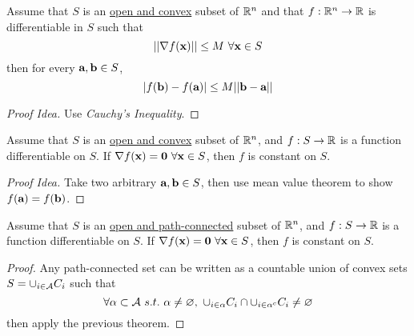 \documentclass[11pt]{article}
\newcommand{\vex}[0]{\ve{x}}
\newcommand{\vea}[0]{\ve{a}}
\newcommand{\veb}[0]{\ve{b}}
\begin{document}
			\begin{theorem}
				Assume that $S$ is an \ul{open and convex} subset of $\mathbb{R}^n$ and that $f: \mathbb{R}^n \to \mathbb{R}$ is differentiable in $S$ such that
				\begin{equation}
					\norm{\nabla f(\vex)} \leq M\ \forall \vex \in S
				\end{equation}
				then for every $\vea, \veb \in S$,
				\begin{equation}
					|f(\veb) - f(\vea)| \leq M \norm{\veb - \vea}
				\end{equation}
				\begin{proof}[Proof Idea]
					Use \emph{Cauchy's Inequality}.
				\end{proof}
			\end{theorem}
			
			\begin{theorem}
				Assume that $S$ is an \ul{open and convex} subset of $\mathbb{R}^n$, and $f: S \to \mathbb{R}$ is a function differentiable on $S$. If $\nabla f(\vex) = \ve{0}\ \forall \vex \in S$, then $f$ is constant on $S$.
				\begin{proof}[Proof Idea]
					Take two arbitrary $\vea, \veb \in S$, then use mean value theorem to show $f(\vea) = f(\veb)$.
				\end{proof}
			\end{theorem}
			
			\begin{theorem}
				Assume that $S$ is an \ul{open and path-connected} subset of $\mathbb{R}^n$, and $f: S \to \mathbb{R}$ is a function differentiable on $S$. If $\nabla f(\vex) = \ve{0}\ \forall \vex \in S$, then $f$ is constant on $S$.
				\begin{proof}
					Any path-connected set can be written as a countable union of convex sets $S = \cup_{i \in \mathcal{{A}}} C_i$ such that
					\begin{equation}
						\forall \alpha \subset \mathcal{{A}}\ s.t.\ \alpha \neq \varnothing,\ \cup_{i \in \alpha} C_i \cap \cup_{i \in \alpha^c} C_i \neq \varnothing
					\end{equation}
					then apply the previous theorem.
				\end{proof}
			\end{theorem}
			
		\subsection{}
		\subsection{}
\end{document}
